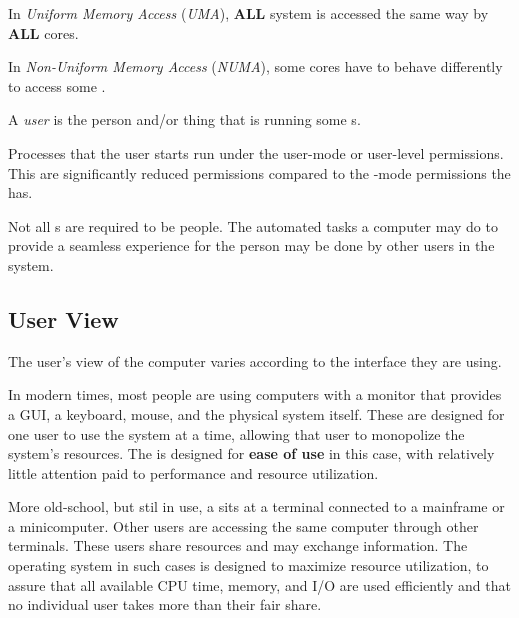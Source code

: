 \begin{definition}\label{def:Uniform_Memory_Access}
  In \emph{Uniform Memory Access} (\emph{UMA}), \textbf{ALL} system  is accessed the same way by \textbf{ALL} cores.
\end{definition}

\begin{definition}\label{def:Non_Uniform_Memory_Access}
  In \emph{Non-Uniform Memory Access} (\emph{NUMA}), some cores have to behave differently to access some .
\end{definition}

\begin{definition}[User]\label{def:User}
  A \emph{user} is the person and/or thing that is running some s.

  Processes that the user starts run under the user-mode or user-level permissions.
  This are significantly reduced permissions compared to the -mode permissions the  has.

  \begin{remark}\label{rmk:Thing_Users}
    Not all s are required to be people.
    The automated tasks a computer may do to provide a seamless experience for the person may be done by other users in the system.
  \end{remark}
\end{definition}

\subsection{User View}\label{subsec:User_View}
The user's view of the computer varies according to the interface they are using.

In modern times, most people are using computers with a monitor that provides a GUI, a keyboard, mouse, and the physical system itself.
These are designed for one user to use the system at a time, allowing that user to monopolize the system's resources.
The  is designed for \textbf{ease of use} in this case, with relatively little attention paid to performance and resource utilization.

More old-school, but stil in use, a  sits at a terminal connected to a mainframe or a minicomputer.
Other users are accessing the same computer through other terminals.
These users share resources and may exchange information.
The operating system in such cases is designed to maximize resource utilization, to assure that all available CPU time, memory, and I/O are used efficiently and that no individual user takes more than their fair share.

